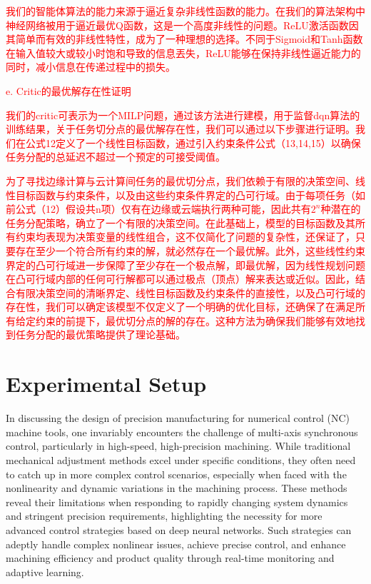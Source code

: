 \documentclass[preprint,12pt]{elsarticle}
\begin{document}
\textcolor{red}{我们的智能体算法的能力来源于逼近复杂非线性函数的能力。在我们的算法架构中神经网络被用于逼近最优Q函数，这是一个高度非线性的问题。ReLU激活函数因其简单而有效的非线性特性，成为了一种理想的选择。不同于Sigmoid和Tanh函数在输入值较大或较小时饱和导致的信息丟失，ReLU能够在保持非线性逼近能力的同时，减小信息在传递过程中的损失。}

\textcolor{red}{e.	Critic的最优解存在性证明}

\textcolor{red}{我们的critic可表示为一个MILP问题，通过该方法进行建模，用于监督dqn算法的训练结果，关于任务切分点的最优解存在性，我们可以通过以下步骤进行证明。我们在公式12定义了一个线性目标函数，通过引入约束条件公式（13,14,15）以确保任务分配的总延迟不超过一个预定的可接受阈值。}

\textcolor{red}{为了寻找边缘计算与云计算间任务的最优切分点，我们依赖于有限的决策空间、线性目标函数与约束条件，以及由这些约束条件界定的凸可行域。由于每项任务（如前公式（12）假设共n项）仅有在边缘或云端执行两种可能，因此共有\(2^n\)种潜在的任务分配策略，确立了一个有限的决策空间。在此基础上，模型的目标函数及其所有约束均表现为决策变量的线性组合，这不仅简化了问题的复杂性，还保证了，只要存在至少一个符合所有约束的解，就必然存在一个最优解。此外，这些线性约束界定的凸可行域进一步保障了至少存在一个极点解，即最优解，因为线性规划问题在凸可行域内部的任何可行解都可以通过极点（顶点）解来表达或近似。因此，结合有限决策空间的清晰界定、线性目标函数及约束条件的直接性，以及凸可行域的存在性，我们可以确定该模型不仅定义了一个明确的优化目标，还确保了在满足所有给定约束的前提下，最优切分点的解的存在。这种方法为确保我们能够有效地找到任务分配的最优策略提供了理论基础。}

\section{Experimental Setup}

In discussing the design of precision manufacturing for numerical control (NC) machine tools, one invariably encounters the challenge of multi-axis synchronous control, particularly in high-speed, high-precision machining. While traditional mechanical adjustment methods excel under specific conditions, they often need to catch up in more complex control scenarios, especially when faced with the nonlinearity and dynamic variations in the machining process. These methods reveal their limitations when responding to rapidly changing system dynamics and stringent precision requirements, highlighting the necessity for more advanced control strategies based on deep neural networks. Such strategies can adeptly handle complex nonlinear issues, achieve precise control, and enhance machining efficiency and product quality through real-time monitoring and adaptive learning\cite{zhong2017precise}.
\end{document}
